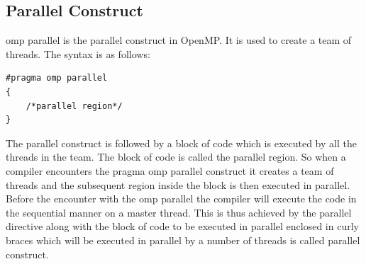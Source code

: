 \documentclass[12pt]{book}
\begin{document}
\subsection{Parallel Construct}

omp parallel is the parallel construct in OpenMP. 
It is used to create a team of threads. The syntax is as follows:
\begin{lstlisting}
#pragma omp parallel
{
    /*parallel region*/
}
\end{lstlisting}
The parallel construct is followed by a block of code which is executed by all the threads in the team. 
The block of code is called the parallel region. So when a compiler encounters the pragma omp parallel construct it creates a team of 
threads and the subsequent region inside the block is then executed in parallel. Before the encounter with the omp parallel the compiler will execute the code in 
the sequential manner on a master thread. This is thus achieved by the parallel directive along with the block of code to be executed in parallel enclosed in curly braces which will be executed in parallel by a number of threads is 
called parallel construct.
\end{document}

